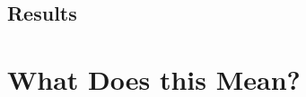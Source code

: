 \documentclass[12pt,twoside]{reedthesis}
\begin{document}
\section{Results}

\chapter{What Does this Mean?}

	


 
\end{document}
